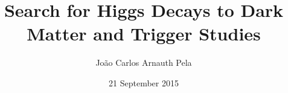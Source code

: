 \documentclass{thesis}
\title{\LARGE Search for Higgs Decays to Dark Matter and Trigger Studies}
\author{João Carlos Arnauth Pela}
\date{21 September 2015}
\begin{document}
\begin{frontmatter}
  
\end{frontmatter}

\begin{mainmatter}
  
  
  
  
  
  
  
  
  
\end{mainmatter}

\begin{backmatter}
  
\end{backmatter}
\end{document}
